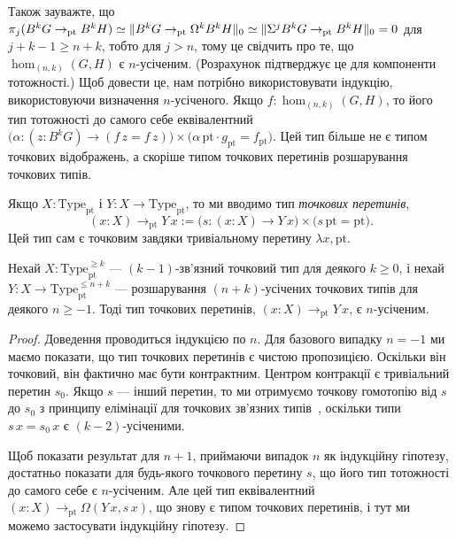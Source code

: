 \documentclass[12pt]{article}
\newcommand*{\Loop}{\Omega}
\newcommand*{\concat}{\cdot}
\newcommand*{\pt}{{\mathrm{pt}}}
\renewcommand*{\equiv}{\mathrel{\simeq}}
\DeclarePairedDelimiter\trunc{\lVert}{\rVert}
\newcommand*{\Type}{\mathrm{Type}}
\newcommand*{\leanref}[1]{{\normalfont[\texttt{\color{DarkBlue}#1}]}}
\begin{document}
Також зауважте, що $\pi_j(B^kG \to_\pt B^kH) \equiv \trunc{B^kG \to_\pt \Loop^kB^kH}_0 \equiv \trunc{\Sigma^jB^kG \to_\pt B^kH}_0 = 0$ для $j+k-1 \ge n+k$, тобто для $j > n$, тому це свідчить про те, що $\hom_{(n,k)}(G,H)$ є $n$-усіченим. (Розрахунок підтверджує це для компоненти тотожності.) Щоб довести це, нам потрібно використовувати індукцію, використовуючи визначення $n$-усіченого. Якщо $f : \hom_{(n,k)}(G,H)$, то його тип тотожності до самого себе еквівалентний $\bigl(\alpha : (z : B^kG) \to (f\,z = f\,z)\bigr) \times \bigl(\alpha\,\pt \concat g_\pt = f_\pt\bigr)$. Цей тип більше не є типом точкових відображень, а скоріше типом точкових перетинів розшарування точкових типів.

\begin{definition}
  Якщо $X : \Type_\pt$ і $Y : X \to \Type_\pt$, то ми вводимо тип \emph{точкових перетинів},
  \[
    (x : X) \to_\pt Y\,x
    := \bigl(s : (x : X) \to Y\,x\bigr)
    \times \bigl(s\,\pt = \pt\bigr).
  \]
  Цей тип сам є точковим завдяки тривіальному перетину $\lambda x, \pt$.
\end{definition}

\begin{theorem}
  Нехай $X : \Type_\pt^{\ge k}$ — $(k-1)$-зв'язний точковий тип для деякого $k \ge 0$, і нехай $Y : X \to \Type_\pt^{\le n+k}$ — розшарування $(n+k)$-усічених точкових типів для деякого $n \ge -1$. Тоді тип точкових перетинів, $(x : X) \to_\pt Y\,x$, є $n$-усіченим. \leanref{is\_trunc\_ppi\_of\_is\_conn}
\end{theorem}

\begin{proof}
  Доведення проводиться індукцією по $n$. Для базового випадку $n=-1$ ми маємо показати, що тип точкових перетинів є чистою пропозицією. Оскільки він точковий, він фактично має бути контрактним. Центром контракції є тривіальний перетин $s_0$. Якщо $s$ — інший перетин, то ми отримуємо точкову гомотопію від $s$ до $s_0$ з принципу елімінації для точкових зв'язних типів~\cite[Лема~7.5.7]{TheBook}, оскільки типи $s\,x = s_0\,x$ є $(k-2)$-усіченими.

  Щоб показати результат для $n+1$, приймаючи випадок $n$ як індукційну гіпотезу, достатньо показати для будь-якого точкового перетину $s$, що його тип тотожності до самого себе є $n$-усіченим. Але цей тип еквівалентний $(x : X) \to_\pt \Loop(Y\,x, s\,x)$, що знову є типом точкових перетинів, і тут ми можемо застосувати індукційну гіпотезу.
\end{proof}
\end{document}
